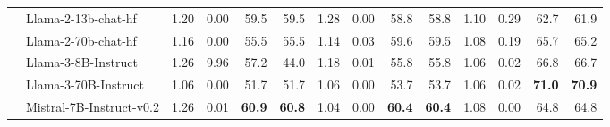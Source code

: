 \begin{table}[]
{\begin{tabular}{l|l|rrrr|rrrr|rrrr}
                                  & Llama-2-13b-chat-hf             & 1.20                             & 0.00                             & 59.5                          & 59.5                               & 1.28                             & 0.00                             & 58.8                          & 58.8                               & 1.10                             & 0.29                             & 62.7                          & 61.9                              \\
                                  & Llama-2-70b-chat-hf             & 1.16                             & 0.00                             & 55.5                          & 55.5                               & 1.14                             & 0.03                             & 59.6                          & 59.5                               & 1.08                             & 0.19                             & 65.7                          & 65.2                              \\
                                  & Llama-3-8B-Instruct             & 1.26                             & 9.96                             & 57.2                          & 44.0                               & 1.18                             & 0.01                             & 55.8                          & 55.8                               & 1.06                             & 0.02                             & 66.8                          & 66.7                              \\
                                  & Llama-3-70B-Instruct            & 1.06                             & 0.00                             & 51.7                          & 51.7                               & 1.06                             & 0.00                             & 53.7                          & 53.7                               & 1.06                             & 0.02                             & \textbf{71.0}                          & \textbf{70.9}                              \\
                                  & Mistral-7B-Instruct-v0.2        & 1.26                             & 0.01                             & \textbf{60.9}                          & \textbf{60.8}                               & 1.04                             & 0.00                             & \textbf{60.4}                          & \textbf{60.4}                               & 1.08                             & 0.00                             & 64.8                          & 64.8                              \\

\end{tabular}}
\end{table}
